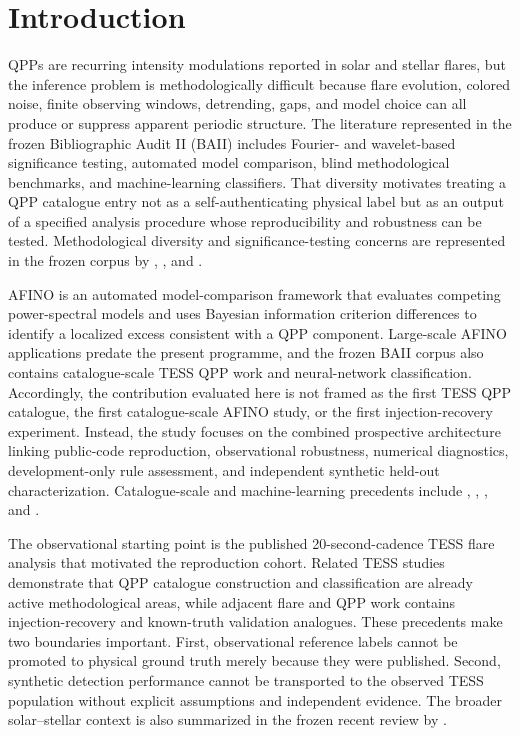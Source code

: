 \documentclass[11pt,a4paper]{article}
\begin{document}
\section{Introduction}
QPPs are recurring intensity modulations reported in solar and stellar flares, but the inference problem is methodologically difficult because flare evolution, colored noise, finite observing windows, detrending, gaps, and model choice can all produce or suppress apparent periodic structure. The literature represented in the frozen Bibliographic Audit II (BAII) includes Fourier- and wavelet-based significance testing, automated model comparison, blind methodological benchmarks, and machine-learning classifiers. That diversity motivates treating a QPP catalogue entry not as a self-authenticating physical label but as an output of a specified analysis procedure whose reproducibility and robustness can be tested. Methodological diversity and significance-testing concerns are represented in the frozen corpus by \citet{Inglis2016}, \citet{Pugh2017}, and \citet{Broomhall2019}.

AFINO is an automated model-comparison framework that evaluates competing power-spectral models and uses Bayesian information criterion differences to identify a localized excess consistent with a QPP component. Large-scale AFINO applications predate the present programme, and the frozen BAII corpus also contains catalogue-scale TESS QPP work and neural-network classification. Accordingly, the contribution evaluated here is not framed as the first TESS QPP catalogue, the first catalogue-scale AFINO study, or the first injection-recovery experiment. Instead, the study focuses on the combined prospective architecture linking public-code reproduction, observational robustness, numerical diagnostics, development-only rule assessment, and independent synthetic held-out characterization. Catalogue-scale and machine-learning precedents include \citet{HowardMacGregor2022}, \citet{Belov2024}, \citet{Joshi2025}, and \citet{Wang2025}.

The observational starting point is the published 20-second-cadence TESS flare analysis that motivated the reproduction cohort. Related TESS studies demonstrate that QPP catalogue construction and classification are already active methodological areas, while adjacent flare and QPP work contains injection-recovery and known-truth validation analogues. These precedents make two boundaries important. First, observational reference labels cannot be promoted to physical ground truth merely because they were published. Second, synthetic detection performance cannot be transported to the observed TESS population without explicit assumptions and independent evidence. The broader solar--stellar context is also summarized in the frozen recent review by \citet{Reale2026}.
\end{document}
